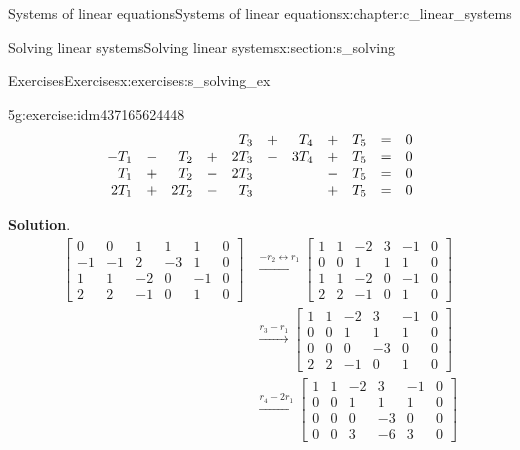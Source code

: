 \documentclass[oneside,10pt,]{book}
\makeatletter
\newcommand{\blocktitlefont}{\relax}
\numberwithin{equation}{section}
\newenvironment{linsys}[2][m]{
\begin{array}[#1]{@{}*{#2}{rc}r@{}}
}{
\end{array}}
\newcommand{\amp}{&}
\makeatother
\begin{document}
\begin{chapterptx}{Systems of linear equations}{}{Systems of linear equations}{}{}{x:chapter:c_linear_systems}
\begin{sectionptx}{Solving linear systems}{}{Solving linear systems}{}{}{x:section:s_solving}
\begin{exercises-subsection-numberless}{Exercises}{}{Exercises}{}{}{x:exercises:s_solving_ex}
\begin{exercisegroup}
\begin{divisionexerciseeg}{5}{}{}{g:exercise:idm437165624448}%
%
\begin{equation*}
\begin{linsys}{5} \amp  \amp  \amp \amp  T_3\amp +\amp T_4\amp +\amp T_5 \amp =\amp 0\\ -T_1\amp -\amp T_2 \amp +\amp 2T_3 \amp -\amp 3T_4\amp +\amp T_5 \amp =\amp 0\\ T_1\amp + \amp T_2 \amp -\amp 2T_3 \amp \amp \amp -\amp T_5 \amp =\amp 0\\ 2T_1\amp + \amp 2T_2 \amp -\amp T_3 \amp \amp \amp +\amp T_5 \amp =\amp 0 \end{linsys}
\end{equation*}
%
\par\smallskip%
\noindent\textbf{\blocktitlefont Solution}.\hypertarget{g:solution:idm437165623200}{}\quad{}%
\begin{align*}
\begin{bmatrix}0\amp 0\amp 1\amp 1\amp 1\amp 0\\ -1\amp -1\amp 2\amp -3\amp 1\amp 0\\ 1\amp 1\amp -2\amp 0\amp -1\amp 0\\ 2\amp 2\amp -1\amp 0\amp 1\amp 0 \end{bmatrix} \amp \xrightarrow[]{-r_2 \leftrightarrow r_1} \begin{bmatrix}1\amp 1\amp -2\amp 3\amp -1\amp 0\\ 0\amp 0\amp 1\amp 1\amp 1\amp 0\\ 1\amp 1\amp -2\amp 0\amp -1\amp 0\\ 2\amp 2\amp -1\amp 0\amp 1\amp 0 \end{bmatrix}\\
\amp \xrightarrow[]{r_3-r_1} \begin{bmatrix}1\amp 1\amp -2\amp 3\amp -1\amp 0\\ 0\amp 0\amp 1\amp 1\amp 1\amp 0\\ 0\amp 0\amp 0\amp -3\amp 0\amp 0\\ 2\amp 2\amp -1\amp 0\amp 1\amp 0 \end{bmatrix}\\
\amp \xrightarrow[]{r_4-2r_1} \begin{bmatrix}1\amp 1\amp -2\amp 3\amp -1\amp 0\\ 0\amp 0\amp 1\amp 1\amp 1\amp 0\\ 0\amp 0\amp 0\amp -3\amp 0\amp 0\\ 0\amp 0\amp 3\amp -6\amp 3\amp 0 \end{bmatrix}\\

\end{align*}
\end{divisionexerciseeg}
\end{exercisegroup}
\end{exercises-subsection-numberless}
\end{sectionptx}
\end{chapterptx}
\end{document}
